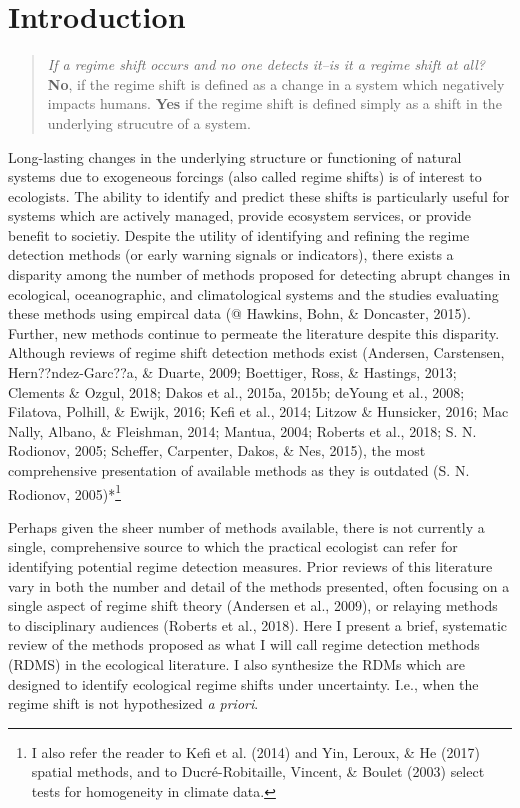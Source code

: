 \documentclass[12pt,twoside,openany]{reedthesis}
\begin{document}
\hypertarget{introduction}{%
\section{Introduction}\label{introduction}}
\begin{quote}
\emph{If a regime shift occurs and no one detects it--is it a regime shift at all?}
\textbf{No}, if the regime shift is defined as a change in a system which negatively impacts humans. \textbf{Yes} if the regime shift is defined simply as a shift in the underlying strucutre of a system.
\end{quote}
Long-lasting changes in the underlying structure or functioning of natural systems due to exogeneous forcings (also called regime shifts) is of interest to ecologists. The ability to identify and predict these shifts is particularly useful for systems which are actively managed, provide ecosystem services, or provide benefit to societiy. Despite the utility of identifying and refining the regime detection methods (or early warning signals or indicators), there exists a disparity among the number of methods proposed for detecting abrupt changes in ecological, oceanographic, and climatological systems and the studies evaluating these methods using empircal data (@ Hawkins, Bohn, \& Doncaster, 2015). Further, new methods continue to permeate the literature despite this disparity. Although reviews of regime shift detection methods exist (Andersen, Carstensen, Hern??ndez-Garc??a, \& Duarte, 2009; Boettiger, Ross, \& Hastings, 2013; Clements \& Ozgul, 2018; Dakos et al., 2015a, 2015b; deYoung et al., 2008; Filatova, Polhill, \& Ewijk, 2016; Kefi et al., 2014; Litzow \& Hunsicker, 2016; Mac Nally, Albano, \& Fleishman, 2014; Mantua, 2004; Roberts et al., 2018; S. N. Rodionov, 2005; Scheffer, Carpenter, Dakos, \& Nes, 2015), the most comprehensive presentation of available methods as they is outdated (S. N. Rodionov, 2005)*\footnote{I also refer the reader to Kefi et al. (2014) and Yin, Leroux, \& He (2017) spatial methods, and to Ducré-Robitaille, Vincent, \& Boulet (2003) select tests for homogeneity in climate data.}

Perhaps given the sheer number of methods available, there is not currently a single, comprehensive source to which the practical ecologist can refer for identifying potential regime detection measures. Prior reviews of this literature vary in both the number and detail of the methods presented, often focusing on a single aspect of regime shift theory (Andersen et al., 2009), or relaying methods to disciplinary audiences (Roberts et al., 2018). Here I present a brief, systematic review of the methods proposed as what I will call regime detection methods (RDMS) in the ecological literature. I also synthesize the RDMs which are designed to identify ecological regime shifts under uncertainty. I.e., when the regime shift is not hypothesized \emph{a priori}.
\end{document}
